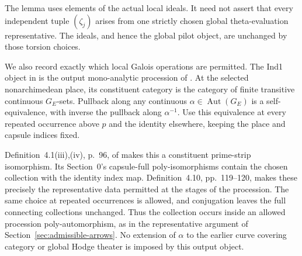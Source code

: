 The lemma uses elements of the actual local
ideals. It need not assert that every
independent tuple \((\zeta_j)\) arises
from one strictly chosen global
theta-evaluation representative.
The ideals, and hence the global
pilot object, are unchanged by
those torsion choices.

We also record exactly which local
Galois operations are permitted.
The Ind1 object in
\cite[Theorem~3.11(i), pp.~153--154]{IUT3}
is the output mono-analytic procession
of \cite[Proposition~6.9(ii)]{IUT1}.
At the selected nonarchimedean place,
its constituent category is the
category of finite transitive
continuous \(G_E\)-sets.
Pullback along any continuous
\(\alpha\in\operatorname{Aut}(G_E)\)
is a self-equivalence, with inverse
the pullback along \(\alpha^{-1}\).
Use this equivalence at every
repeated occurrence above \(p\)
and the identity elsewhere,
keeping the place and capsule
indices fixed.

Definition~4.1(iii),(iv), p.~96,
of \cite{IUT1} makes this a
constituent prime-strip isomorphism.
Its Section~0's capsule-full
poly-isomorphisms contain the
chosen collection with the identity
index map. Definition~4.10,
pp.~119--120, makes these precisely
the representative data permitted
at the stages of the procession.
The same choice at repeated
occurrences is allowed, and
conjugation leaves the full
connecting collections unchanged.
Thus the collection occurs inside
an allowed procession
poly-automorphism, as in the
representative argument of
Section~\ref{sec:admissible-arrows}.
No extension of \(\alpha\) to the
earlier curve covering category
or global Hodge theater is imposed
by this output object.

